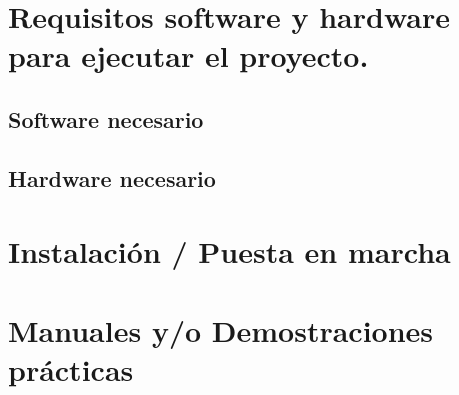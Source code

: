
\section{Requisitos software y hardware para ejecutar el proyecto.}

\subsection{Software necesario}

\subsection{Hardware necesario}

\section{Instalación / Puesta en marcha}

\section{Manuales y/o Demostraciones prácticas}




    
     